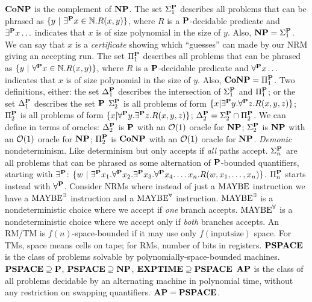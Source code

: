 \wde{$\CoNP$} $\CoNP$ is the complement of $\NP$.
 The set $\sigp{1}$ describes all problems that can be phrased as $\{y\ |\ \exists^{\Pc} x \in \mathbb{N}. R(x,y)\}$, where $R$ is a $\Pc$-decidable predicate and $\exists^{\Pc}x \ldots$ indicates that $x$ is of size polynomial in the size of $y$. Also, $\NP = \sigp{1}$.
 We can say that $x$ is a \emph{certificate} showing which ``guesses'' can made by our NRM giving an accepting run.
 The set $\pip{1}$ describes all problems that can be phrased as $\{y\ |\ \forall^{\Pc} x \in \mathbb{N}. R(x,y)\}$, where $R$ is a $\Pc$-decidable predicate and $\forall^{\Pc}x \ldots$ indicates that $x$ is of size polynomial in the size of $y$. Also, $\CoNP = \pip{1}$.
 Two definitions, either: the set $\delp{1}$ describes the intersection of $\sigp{1}$ and $\pip{1}$; or the set $\delp{1}$ describes the set $\Pc$
 $\sigp{2}$ is all problems of form $\{x | \exists^{\Pc}y.\forall^{\Pc}z. R(x,y,z)\}$;
$\pip{2}$ is all problems of form $\{x | \forall^{\Pc}y.\exists^{\Pc}z. R(x,y,z)\}$; $\delp{2} = \sigp{2} \cap \pip{2}$.
 We can define in terms of oracles:
$\delp{2}$ is $\Pc$ with an $\bO(1)$ oracle for $\NP$;
$\sigp{2}$ is $\NP$ with an $\bO(1)$ oracle for $\NP$;
$\pip{2}$ is $\CoNP$ with an $\bO(1)$ oracle for $\NP$.
 \emph{Demonic} nondeterminism. Like determinism but only accepts if \emph{all} paths accept.
 $\sigp{n}$ are all problems that can be phrased as some alternation of $\Pc$-bounded quantifiers, starting with $\exists^{\Pc}$: 
$\{w\ |\ \exists^{\Pc}x_1.\forall^{\Pc}x_2.\exists^{\Pc}x_3.\forall^{\Pc}x_4.\ldots x_n.R(w,x_1,\ldots,x_n)\}$.
$\pip{n}$ starts instead with $\forall^{\Pc}$.
 Consider NRMs where instead of just a $\Mbe$ instruction we have a $\Mbee$ instruction and a $\Mbea$ instruction. 
$\Mbee$ is a nondeterministic choice where we accept if \emph{one} branch accepts. 
$\Mbea$ is a nondeterministic choice where we accept only if \emph{both} branches accepts. 
\wde{$\PSPACE$} An RM/TM is $f(n)$-space-bounded if it may use only $f(\mathrm{inputsize})$ space. For TMs, space means cells on tape; for RMs, number of bits in registers. 
$\PSPACE$ is the class of problems solvable by polynomially-space-bounded machines. $\PSPACE \supseteq \Pc$, $\PSPACE\supseteq \NP$, $\EXPTIME \supseteq \PSPACE$
\wde{$\AP$} $\AP$ is the class of all problems decidable by an alternating machine in polynomial time, without any restriction on swapping quantifiers. $\AP = \PSPACE$.